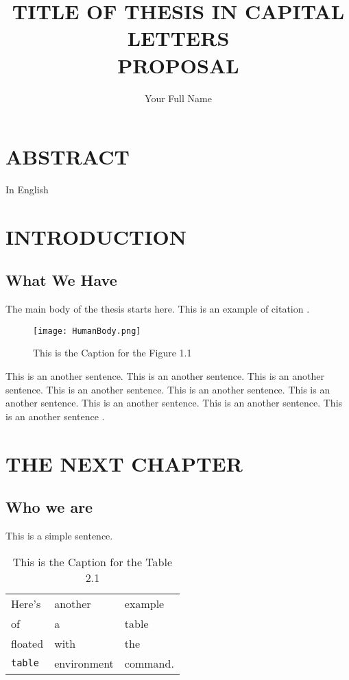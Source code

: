\documentclass[12pt]{report}
\title{TITLE OF THESIS IN CAPITAL LETTERS \\ PROPOSAL}
\author{Your Full Name}
\begin{document}
\makecstitle

\chapter*{ABSTRACT}
In English

\chapter{INTRODUCTION}

\section{What We Have}
The main body of the thesis starts here.
This is an example of citation \cite{label}.


\begin{figure}[h]
\begin{center}
\texttt{[image: HumanBody.png]}
\caption{This is the Caption for the Figure 1.1}
\end{center}
\end{figure}

This is an another sentence. This is an another sentence. This is an another sentence. This is an another sentence. 
This is an another sentence. This is an another sentence. This is an another sentence. This is an another sentence. 
This is an another sentence \cite{lee}.

\chapter{THE NEXT CHAPTER}
\section{Who we are}

This is a simple sentence.
\begin{table}[h]
\begin{center}
\begin{tabular}{lll}
Here's       & another     & example  \\
of           & a           & table    \\
floated      & with        & the      \\
\verb+table+ & environment & command.
\end{tabular}
\end{center}
\caption{This is the Caption for the Table 2.1}
\end{table}
\end{document}

